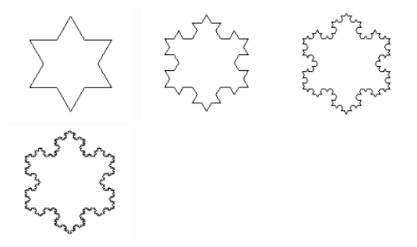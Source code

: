\documentclass[11pt]{book}
\begin{document}
\newtheorem{lambdaterme}{D\'{e}finition}
\newtheorem{redex}{Définition}
\newtheorem{betareduc}{D\'{e}finition}
\newtheorem{lambdareduc}{Th\'{e}oreme}
\newtheorem{ChurchRosser}{Th\'{e}oreme}
\newtheorem{etaequ}{Définition}
\includegraphics[width=3.5cm, height=3cm]{./flocon1.pdf}
\clearpage%
\includegraphics[width=3.5cm, height=3cm]{./flocon2.pdf}
\clearpage%
\includegraphics[width=3.5cm, height=3cm]{./flocon3.pdf}
\clearpage%
\includegraphics[width=3.5cm, height=3cm]{./flocon4.pdf}
\clearpage%
\end{document}
